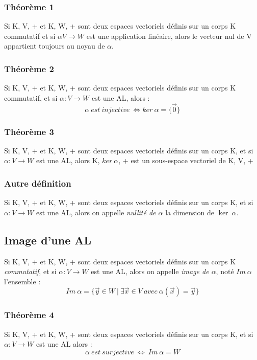 \documentclass[12pt, a4paper, openany]{article}
\begin{document}
\subsubsection{Théorème 1}
Si K, V, + et K, W, + sont deux espaces vectoriels définis sur un corps K commutatif et si $\alpha V \rightarrow W$ est une application linéaire, alors le vecteur nul de V appartient toujours au noyau de $\alpha$.

\subsubsection{Théorème 2}
Si K, V, + et K, W, + sont deux espaces vectoriels définis sur un corps K commutatif, et si $\alpha : V \rightarrow W$ est une AL, alors :
$$\alpha\ est\ injective\ \Leftrightarrow ker\ \alpha = \{\vec{0}\}$$

\subsubsection{Théorème 3}
Si K, V, + et K, W, + sont deux espaces vectoriels définis sur un corps K,  et si $\alpha : V \rightarrow W$ est une AL, alors K, $ker\ \alpha$, + est un sous-espace vectoriel de K, V, +

\subsubsection{Autre définition}
Si K, V, + et K, W, + sont deux espaces vectoriels définis sur un corps K,  et si $\alpha : V \rightarrow W$ est une AL, alors on appelle \textit{nullité de $\alpha$} la dimension de $\ker\ \alpha$.

\subsection{Image d'une AL}
Si K, V, + et K, W, + sont deux espaces vectoriels définis sur un corps K \textit{commutatif},  et si $\alpha : V \rightarrow W$ est une AL, alors on appelle \textit{image de $\alpha$}, noté $Im\ \alpha$ l'ensemble :
$$Im\ \alpha = \{\vec{y} \in W\ |\ \exists \vec{x} \in V\ avec\ \alpha(\vec{x}) = \vec{y}\}$$

\subsubsection{Théorème 4}
Si K, V, + et K, W, + sont deux espaces vectoriels définis sur un corps K,  et si $\alpha : V \rightarrow W$ est une AL alors :
$$\alpha\ est\ surjective\ \Leftrightarrow\ Im\ \alpha = W$$
\end{document}
